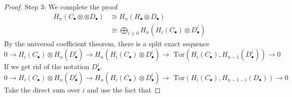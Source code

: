 \documentclass[11pt]{article}
\newcommand{\tor}{\text{ Tor}}
\newcommand{\lrta}{\longrightarrow}
\begin{document}
\begin{proof}
Step 3: We complete the proof
$$
\begin{aligned}
H_n(C_\bullet \otimes \otimes D_\bullet)&\cong H_n(H_\bullet\otimes D_\bullet)\\
&\cong \bigoplus_{i\geq 0} H_n(H_i(C_\bullet)\otimes D_\bullet^i)
\end{aligned}
$$
By the universal coefficient theorem, there is a split exact sequence
$$
0\lrta H_i(C_\bullet)\otimes H_n(D^i_\bullet)\lrta H_n(H_i(C_\bullet)\otimes D^i_\bullet)\lrta \tor(H_i (C_\bullet),H_{n-1}(D^i_\bullet))\lrta 0
$$
If we get rid of the notation $D^i_\bullet$.
$$0\lrta H_i(C_\bullet)\otimes H_n(D^i_\bullet)\lrta H_n(H_i(C_\bullet)\otimes D^i_\bullet)\lrta \tor(H_i (C_\bullet),H_{n-1-i}(D_\bullet))\lrta 0
$$
Take the direct sum over $i$ and use the fact that 


\end{proof}
\end{document}

